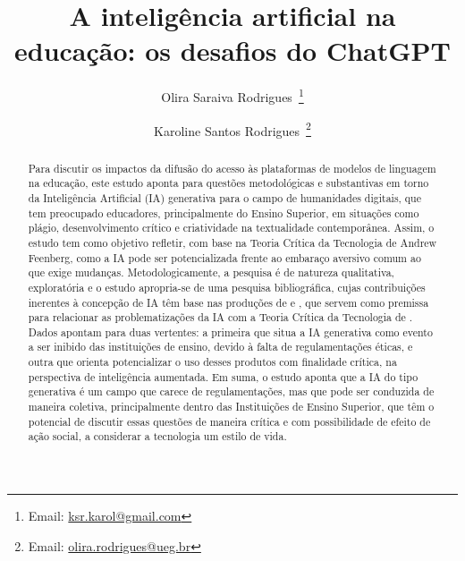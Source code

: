 \documentclass[portuguese]{textolivre}
\title{A inteligência artificial na educação: os desafios do ChatGPT}
\author[1]{Olira Saraiva Rodrigues~\orcid{0000-0003-2371-3030}\thanks{Email: \href{mailto:ksr.karol@gmail.com}{ksr.karol@gmail.com}}}
\author[1]{Karoline Santos Rodrigues~\orcid{0000-0002-5139-9950}\thanks{Email: \href{mailto:olira.rodrigues@ueg.br}{olira.rodrigues@ueg.br}}}
\affil[1]{Universidade Estadual do Goiás, Programa de Pós-graduação Interdisciplinar em Educação, Linguagem e Tecnologias, Anápolis, Goiás, Brasil.}
\begin{document}
\maketitle

\begin{polyabstract}
\begin{abstract}
Para discutir os impactos da difusão do acesso às plataformas de modelos de linguagem na educação, este estudo aponta para questões metodológicas e substantivas em torno da Inteligência Artificial (IA) generativa para o campo de humanidades digitais, que tem preocupado educadores, principalmente do Ensino Superior, em situações como plágio, desenvolvimento crítico e criatividade na textualidade contemporânea. Assim, o estudo tem como objetivo refletir, com base na Teoria Crítica da Tecnologia de Andrew Feenberg, como a IA pode ser potencializada frente ao embaraço aversivo comum ao que exige mudanças. Metodologicamente, a pesquisa é de natureza qualitativa, exploratória e o estudo apropria-se de uma pesquisa bibliográfica, cujas contribuições inerentes à concepção de IA têm base nas produções de \textcite{2022kaufman} e \textcite{santaella2021humanos, santaella2023inteligencia}, que servem como premissa para relacionar as problematizações da IA com a Teoria Crítica da Tecnologia de \textcite{feenberg2003, feenberg2004}. Dados apontam para duas vertentes: a primeira que situa a IA generativa como evento a ser inibido das instituições de ensino, devido à falta de regulamentações éticas, e outra que orienta potencializar o uso desses produtos com finalidade crítica, na perspectiva de inteligência aumentada. Em suma, o estudo aponta que a IA do tipo generativa é um campo que carece de regulamentações, mas que pode ser conduzida de maneira coletiva, principalmente dentro das Instituições de Ensino Superior, que têm o potencial de discutir essas questões de maneira crítica e com possibilidade de efeito de ação social, a considerar a tecnologia um estilo de vida.

\end{abstract}


\end{polyabstract}
\end{document}
